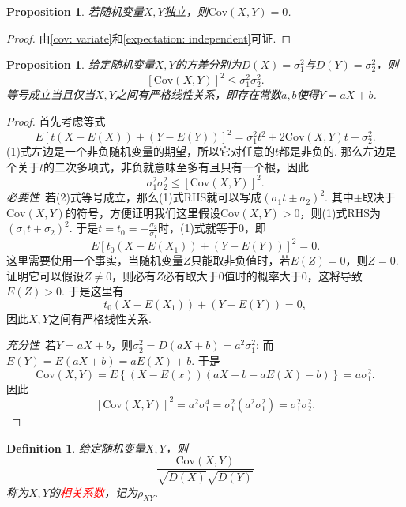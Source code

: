 \documentclass{article}
\newtheorem{proposition}[theorem]{Proposition}
\newtheorem{definition}[theorem]{Definition}
\newcommand{\redt}[1]{\textcolor{red}{#1}}
\begin{document}
\begin{proposition}
\rm 若随机变量$X,Y$独立，则$\text{Cov}(X,Y)=0$.
\end{proposition}

\begin{proof}
由\ref{cov: variate}和\ref{expectation: independent}可证. 
\end{proof}

\begin{proposition}\label{cov: lemma1}
\rm 给定随机变量$X,Y$的方差分别为$D(X)=\sigma_1^2$与$D(Y)=\sigma_2^2$，则
$$
[\text{Cov}(X,Y)]^2  \leq \sigma_1^2\sigma_2^2.
$$
等号成立当且仅当$X,Y$之间有严格线性关系，即存在常数$a,b$使得$Y=aX+b$.
\end{proposition}

\begin{proof}
首先考虑等式
\begin{equation}
E\left[t(X-E(X)) + (Y-E(Y))\right]^2 = \sigma_1^2t^2 + 2\text{Cov}(X,Y)t + \sigma_2^2.
\end{equation}
(1)式左边是一个非负随机变量的期望，所以它对任意的$t$都是非负的. 那么左边是个关于$t$的二次多项式，非负就意味至多有且只有一个根，因此
\begin{equation}
\sigma_1^2\sigma_2^2 \leq \left[\text{Cov}(X,Y)\right]^2.
\end{equation}
\emph{必要性}\ 若(2)式等号成立，那么(1)式RHS就可以写成$(\sigma_1t \pm \sigma_2)^2$. 其中$\pm$取决于$\text{Cov}(X,Y)$的符号，方便证明我们这里假设$\text{Cov}(X,Y) > 0$，则(1)式RHS为$(\sigma_1t +\sigma_2)^2$. 于是$t=t_0=-\frac{\sigma_2}{\sigma_1}$时，(1)式就等于$0$，即
$$
E\left[t_0(X-E(X_1)) + (Y-E(Y))\right]^2 = 0.
$$
这里需要使用一个事实，当随机变量$Z$只能取非负值时，若$E(Z) = 0$，则$Z=0$. 证明它可以假设$Z \neq 0$，则必有$Z$必有取大于$0$值时的概率大于$0$，这将导致$E(Z) > 0$. 于是这里有
$$
t_0(X-E(X_1)) + (Y-E(Y)) = 0,
$$
因此$X,Y$之间有严格线性关系.

\emph{充分性}\ 若$Y=aX+b$，则$\sigma_2^2 = D(aX+b)=a^2\sigma_1^2$; 而$E(Y) = E(aX+b) = aE(X)+b$. 于是
$$
\text{Cov}(X,Y) = E\left\{(X-E(x))(aX+b-aE(X)-b)\right\} = a\sigma_1^2.
$$
因此
$$
[\text{Cov}(X,Y)]^2  =a^2\sigma_1^4=\sigma_1^2(a^2\sigma_1^2) =\sigma_1^2\sigma_2^2.
$$
\end{proof}

\begin{definition}
\rm 给定随机变量$X,Y$，则
$$
\frac{\text{Cov}(X,Y)}{\sqrt{D(X)}\sqrt{D(Y)}}
$$
称为$X,Y$的\redt{相关系数}，记为$\rho_{XY}$.
\end{definition}
\end{document}

